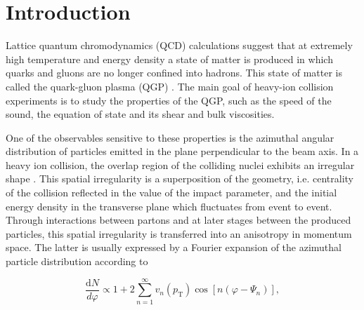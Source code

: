 \documentclass[ALICE,manyauthors]{cernphprep}
\begin{document}
\setcounter{page}{2} %
\tableofcontents
\newpage
\setcounter{page}{3}
\section{Introduction}
\label{Sec:Introduction}

Lattice quantum chromodynamics (QCD) calculations \cite{Borsanyi:2010cj,Bhattacharya:2014ara} suggest that at extremely high temperature and energy density a state of matter is produced in which quarks and gluons are no longer confined into hadrons. This state of matter is called the quark-gluon plasma (QGP) \cite{Shuryak:1984nq, Cleymans:1985wb, Bass:1998vz}. The main goal of heavy-ion collision experiments is to study the properties of the QGP, such as the speed of the sound, the equation of state and its shear and bulk viscosities.

One of the observables sensitive to these properties is the azimuthal angular distribution of particles emitted in the plane perpendicular to the beam axis. In a heavy ion collision, the overlap region of the colliding nuclei exhibits an irregular shape \cite{Miller:2003kd,Bhalerao:2006tp, Alver:2008zza, Alver:2010gr, Alver:2010dn, Manly:2005zy, Voloshin:2006gz}. This spatial irregularity is a superposition of the geometry, i.e. centrality of the collision reflected in the value of the impact parameter, and the initial energy density in the transverse plane which fluctuates from event to event. Through interactions between partons and at later stages between the produced particles, this spatial irregularity is transferred into an anisotropy in momentum space. The latter is usually expressed by a Fourier expansion of the azimuthal particle distribution \cite{Voloshin:1994mz} according to

\begin{equation}
\frac{\mathrm{d}N}{d\varphi} \propto 1+2\sum_{n=1}^{\infty} v_n(p_{\mathrm{T}}) \cos[n(\varphi - \Psi_n)],
\label{Eq:Fourier}
\end{equation}


\end{document}
